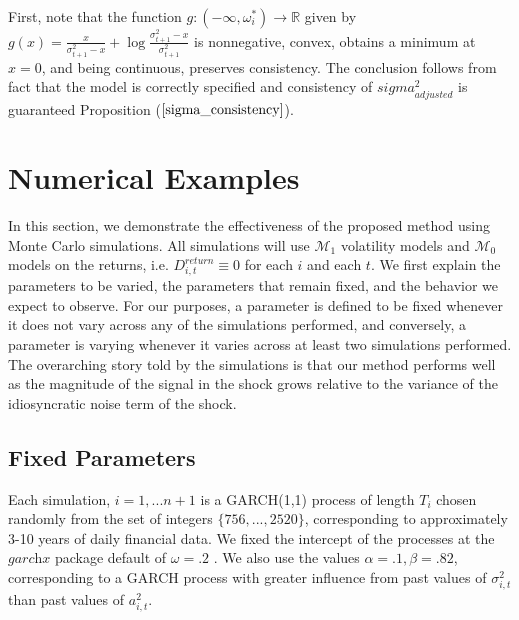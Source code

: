\documentclass[11pt,3p,review,authoryear]{elsarticle}
\def\mc#1{\mathcal{#1}} %
\def\mc#1{\mathcal{#1}}
\theoremstyle{definition}
\newenvironment{proof-of-proposition}[1][{}]{\noindent{\bf
    Proof of Proposition {#1}}
  \hspace*{.5em}}{\qed\bigskip\\}
\begin{document}
\begin{proof-of-proposition}
  First, note that the function $g:(-\infty,\omega_{i}^{*})\rightarrow \mathbb{R}$ given by $g(x) = \frac{x}{\sigma^{2}_{t+1}-x} + \log{\frac{\sigma_{t+1}^{2}-x}{\sigma_{t+1}^{2}} }$ is nonnegative, convex, obtains a minimum at $x = 0$, and being continuous, preserves consistency. The conclusion follows from fact that the model is correctly specified and consistency of $sigma^{2}_{adjusted}$ is guaranteed Proposition ($\ref{sigma_consistency}$). 
\end{proof-of-proposition}

\section{Numerical Examples}

In this section, we demonstrate the effectiveness of the proposed method using Monte Carlo simulations.  All simulations will use $\mc{M}_1$ volatility models and $\mc{M}_0$ models on the returns, i.e. $  D^{return}_{i,t} \equiv 0$ for each $i$ and each $t$.  We first explain the parameters to be varied, the parameters that remain fixed, and the behavior we expect to observe.  For our purposes, a parameter is defined to be fixed whenever it does not vary across any of the simulations performed, and conversely, a parameter is varying whenever it varies across at least two simulations performed. The overarching story told by the simulations is that our method performs well as the magnitude of the signal in the shock grows relative to the variance of the idiosyncratic noise term of the shock. 

  \subsection{Fixed Parameters}
Each simulation, $i=1,...n+1$ is a GARCH(1,1) process of length $T_{i}$ chosen randomly from the set of integers $\{756,...,2520\}$, corresponding to approximately 3-10 years of daily financial data.  We fixed the intercept of the processes at the $\textit{garchx}$ package default of $\omega = .2$ \citep{RePEc:pra:mprapa:100301}.  We also use the values $\alpha=.1, \beta = .82$, corresponding to a GARCH process with greater influence from past values of $\sigma^{2}_{i,t}$ than past values of $a^{2}_{i,t}$.
\end{document}
